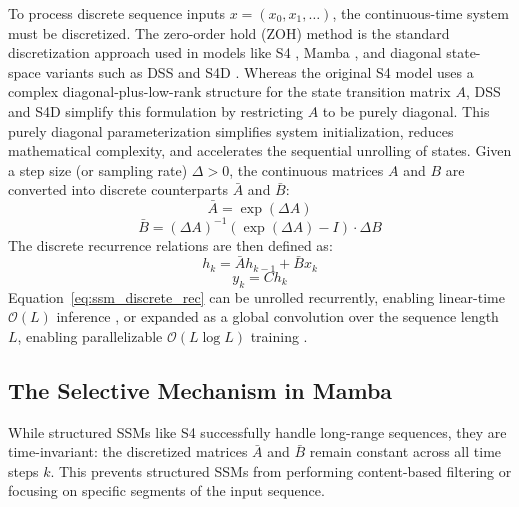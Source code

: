 To process discrete sequence inputs $x = (x_0, x_1, \dots)$, the continuous-time system must be discretized. The zero-order hold (ZOH) method is the standard discretization approach used in models like S4 \cite{guEfficientlyModelingLong2022}, Mamba \cite{guMambaLinearTimeSequence2024}, and diagonal state-space variants such as DSS \cite{guptaDiagonalStateSpaces} and S4D \cite{guParameterizationInitializationDiagonal}. Whereas the original S4 model uses a complex diagonal-plus-low-rank structure for the state transition matrix $A$, DSS and S4D simplify this formulation by restricting $A$ to be purely diagonal. This purely diagonal parameterization simplifies system initialization, reduces mathematical complexity, and accelerates the sequential unrolling of states. Given a step size (or sampling rate) $\Delta > 0$, the continuous matrices $A$ and $B$ are converted into discrete counterparts $\bar{A}$ and $\bar{B}$:
\begin{equation}
    \bar{A} = \exp(\Delta A)
    \label{eq:zoh_a}
\end{equation}
\begin{equation}
    \bar{B} = (\Delta A)^{-1}(\exp(\Delta A) - I) \cdot \Delta B
    \label{eq:zoh_b}
\end{equation}
The discrete recurrence relations are then defined as:
\begin{equation}
    h_k = \bar{A} h_{k-1} + \bar{B} x_k
    \label{eq:ssm_discrete_rec}
\end{equation}
\begin{equation}
    y_k = C h_k
    \label{eq:ssm_discrete_out}
\end{equation}
Equation~\ref{eq:ssm_discrete_rec} can be unrolled recurrently, enabling linear-time $\mathcal{O}(L)$ inference \cite{guMambaLinearTimeSequence2024}, or expanded as a global convolution over the sequence length $L$, enabling parallelizable $\mathcal{O}(L \log L)$ training \cite{guEfficientlyModelingLong2022}.

\subsection{The Selective Mechanism in Mamba}
While structured SSMs like S4 successfully handle long-range sequences, they are time-invariant: the discretized matrices $\bar{A}$ and $\bar{B}$ remain constant across all time steps $k$. This prevents structured SSMs from performing content-based filtering or focusing on specific segments of the input sequence.

